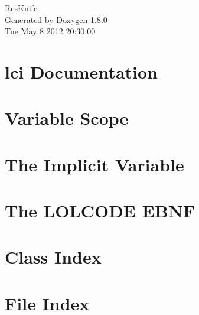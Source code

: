 \documentclass{book}
\begin{document}
\hypersetup{pageanchor=false,citecolor=blue}
\begin{titlepage}
\vspace*{7cm}
\begin{center}
{\Large Res\-Knife }\\
\vspace*{1cm}
{\large Generated by Doxygen 1.8.0}\\
\vspace*{0.5cm}
{\small Tue May 8 2012 20:30:00}\\
\end{center}
\end{titlepage}
\clearemptydoublepage
{}
\tableofcontents
\clearemptydoublepage
{}
\hypersetup{pageanchor=true,citecolor=blue}
\chapter{lci Documentation}
\label{index}\hypertarget{index}{}
\chapter{Variable Scope}
\label{varscope}
\hypertarget{varscope}{}

\chapter{The Implicit Variable}
\label{impvar}
\hypertarget{impvar}{}

\chapter{The L\-O\-L\-C\-O\-D\-E E\-B\-N\-F}
\label{lolebnf}
\hypertarget{lolebnf}{}

\chapter{Class Index}

\chapter{File Index}

\end{document}
